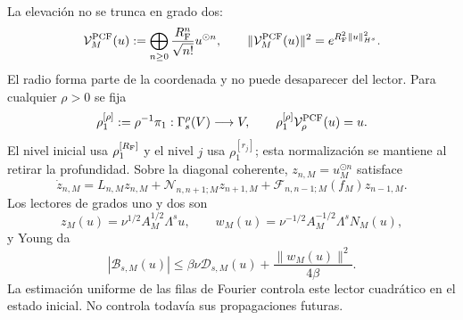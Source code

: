 La elevación no se trunca en grado dos:
\begin{equation}\label{eq:pdf2-ns-pcf}
 \mathcal V_M^{\rm PCF}(u)
 :=\bigoplus_{n\ge0}\frac{R_{\rm F}^n}{\sqrt{n!}}u^{\odot n},
 \qquad
 \|\mathcal V_M^{\rm PCF}(u)\|^2
 =e^{R_{\rm F}^2\|u\|_{H^s}^2}.
\end{equation}
El radio forma parte de la coordenada y no puede desaparecer del lector. Para
cualquier $\rho>0$ se fija
\begin{equation}\label{eq:pdf2-ns-normalized-degree-one-reader}
 \rho^{[\rho]}_1:=\rho^{-1}\pi_1:
 \Gamma_s^\rho(V)\longrightarrow V,
 \qquad
 \rho^{[\rho]}_1\mathcal V_\rho^{\rm PCF}(u)=u.
\end{equation}
El nivel inicial usa $\rho^{[R_{\rm F}]}_1$ y el nivel $j$ usa
$\rho^{[r_j]}_1$; esta normalización se mantiene al retirar la profundidad.
Sobre la diagonal coherente, $z_{n,M}=u_M^{\odot n}$ satisface
\begin{equation}\label{eq:pdf2-ns-carleman}
 \dot z_{n,M}=L_{n,M}z_{n,M}
 +\mathcal N_{n,n+1;M}z_{n+1,M}
 +\mathcal F_{n,n-1;M}(f_M)z_{n-1,M}.
\end{equation}
Los lectores de grados uno y dos son
\[
 z_M(u)=\nu^{1/2}A_M^{1/2}\Lambda^su,
 \qquad
 w_M(u)=\nu^{-1/2}A_M^{-1/2}\Lambda^sN_M(u),
\]
y Young da
\begin{equation}\label{eq:pdf2-ns-young-port}
 |\mathscr B_{s,M}(u)|\le
 \beta\nu\mathscr D_{s,M}(u)+\frac{\|w_M(u)\|^2}{4\beta}.
\end{equation}
La estimación uniforme de las filas de Fourier controla este lector cuadrático en
el estado inicial. No controla todavía sus propagaciones futuras.

